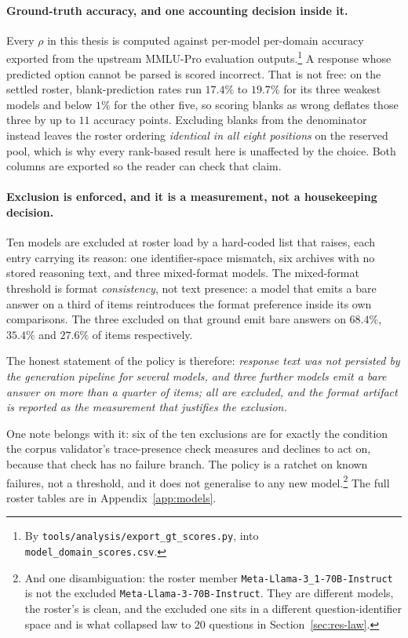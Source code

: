 \paragraph{Ground-truth accuracy, and one accounting decision inside
it.} Every $\rho$ in this thesis is computed against per-model
per-domain accuracy exported from the upstream MMLU-Pro evaluation
outputs.\footnote{By \texttt{tools/analysis/export\_gt\_scores.py},
into \texttt{model\_domain\_scores.csv}.} A response whose predicted option
cannot be parsed is scored incorrect. That is not free: on the settled
roster, blank-prediction rates run $17.4\%$ to $19.7\%$ for its three
weakest models and below $1\%$ for the other five, so scoring blanks
as wrong deflates those three by up to $11$ accuracy points. Excluding
blanks from the denominator instead leaves the roster ordering
\emph{identical in all eight positions} on the reserved pool, which is
why every rank-based result here is unaffected by the choice. Both
columns are exported so the reader can check that claim.

\paragraph{Exclusion is enforced, and it is a measurement, not a
housekeeping decision.}
Ten models are excluded at roster load by a hard-coded list that
raises, each entry carrying its reason: one identifier-space mismatch,
six archives with no stored reasoning text, and three mixed-format
models. The mixed-format threshold is format \emph{consistency}, not
text presence: a model that emits a bare answer on a third of items
reintroduces the format preference inside its own comparisons. The
three excluded on that ground emit bare answers on $68.4\%$, $35.4\%$
and $27.6\%$ of items respectively.

The honest statement of the policy is therefore:
\emph{response text was not persisted by the generation pipeline for
several models, and three further models emit a bare answer on more
than a quarter of items; all are excluded, and the format artifact is
reported as the measurement that justifies the exclusion.}

One note belongs with it: six of the ten exclusions are for exactly
the condition the corpus validator's trace-presence check measures and
declines to act on, because that check has no failure branch. The
policy is a ratchet on known failures, not a threshold, and it does
not generalise to any new model.\footnote{And one disambiguation: the
roster member \texttt{Meta-Llama-3\_1-70B-Instruct} is not the
excluded \texttt{Meta-Llama-3-70B-Instruct}. They are different
models, the roster's is clean, and the excluded one sits in a
different question-identifier space and is what collapsed law to 20
questions in Section~\ref{sec:res-law}.}
The full roster tables are in Appendix~\ref{app:models}.

